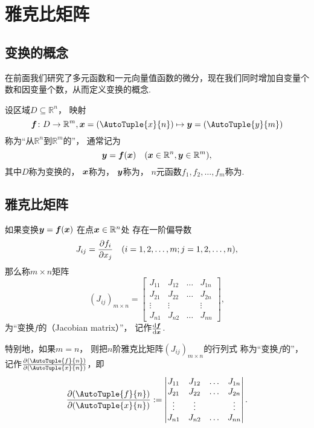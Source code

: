 \section{雅克比矩阵}
\subsection{变换的概念}
在前面我们研究了多元函数和一元向量值函数的微分，现在我们同时增加自变量个数和因变量个数，从而定义变换的概念.
\begin{definition}
设区域\(D \subseteq \mathbb{R}^n\)，
映射\[
	\vb{f}\colon D \to \mathbb{R}^m,
		\vb{x}=(\AutoTuple{x}{n})
		\mapsto\vb{y}=(\AutoTuple{y}{m})
\]
称为“从\(\mathbb{R}^n\)到\(\mathbb{R}^m\)的”，
通常记为\[
	\boldsymbol{y} = \boldsymbol{f}(\boldsymbol{x})
	\quad(\boldsymbol{x}\in\mathbb{R}^n,\boldsymbol{y}\in\mathbb{R}^m),
\]
其中\(D\)称为变换的，
\(\boldsymbol{x}\)称为，
\(\boldsymbol{y}\)称为，
\(n\)元函数\(f_1,f_2,\dotsc,f_m\)称为.
\end{definition}

\subsection{雅克比矩阵}
\begin{definition}
如果变换\(\boldsymbol{y} = \boldsymbol{f}(\boldsymbol{x})\)
在点\(\boldsymbol{x} \in \mathbb{R}^n\)处
存在一阶偏导数\[
	J_{ij} = \pdv{f_i}{x_j}
	\quad(i=1,2,\dotsc,m; j=1,2,\dotsc,n),
\]
那么称\(m \times n\)矩阵\[
	(J_{ij})_{m \times n}
	= \begin{bmatrix}
		J_{11} & J_{12} & \dots & J_{1n} \\
		J_{21} & J_{22} & \dots & J_{2n} \\
		\vdots & \vdots & & \vdots \\
		J_{n1} & J_{n2} & \dots & J_{nn}
	\end{bmatrix},
\]为“变换\(f\)的（Jacobian matrix）”，
记作\(\dv{\boldsymbol{f}}{\boldsymbol{x}}\).

特别地，如果\(m = n\)，
则把\(n\)阶雅克比矩阵\((J_{ij})_{m \times n}\)的行列式
称为“变换\(f\)的”，
记作\(\jacobi{\AutoTuple{f}{n}}{\AutoTuple{x}{n}}\)，即\[
	\jacobi{\AutoTuple{f}{n}}{\AutoTuple{x}{n}}
	\defeq \begin{vmatrix}
		J_{11} & J_{12} & \dots & J_{1n} \\
		J_{21} & J_{22} & \dots & J_{2n} \\
		\vdots & \vdots & & \vdots \\
		J_{n1} & J_{n2} & \dots & J_{nn}
	\end{vmatrix}.
\]
\end{definition}
